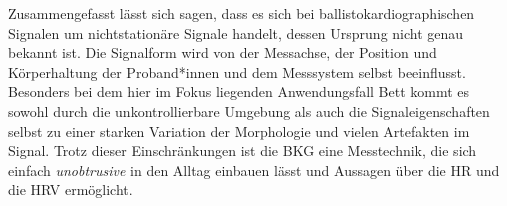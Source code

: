 	
	Zusammengefasst lässt sich sagen, dass es sich bei ballistokardiographischen Signalen um nichtstationäre Signale handelt, dessen Ursprung nicht genau bekannt ist. Die Signalform wird von der Messachse, der Position und Körperhaltung der Proband*innen und dem Messsystem selbst beeinflusst. Besonders bei dem hier im Fokus liegenden Anwendungsfall Bett kommt es sowohl durch die unkontrollierbare Umgebung als auch die Signaleigenschaften selbst zu einer starken Variation der Morphologie und vielen Artefakten im Signal. Trotz dieser Einschränkungen ist die \acl{BKG} eine Messtechnik, die sich einfach \textit{unobtrusive} in den Alltag einbauen lässt und Aussagen über die \acl{HR} und die \acl{HRV} ermöglicht.

